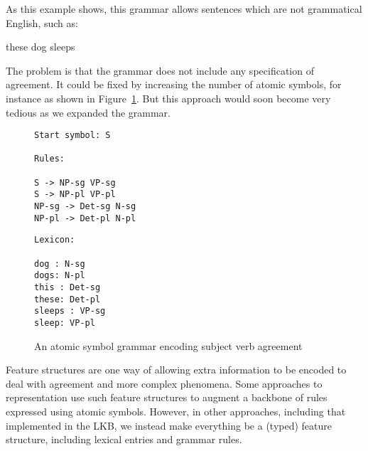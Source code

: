 \documentclass[12pt]{report}
\begin{document}
As this example shows, this grammar allows
sentences which are not grammatical English, such as:
\begin{ex}
these dog sleeps
\end{ex}
The problem is that the grammar does not include any specification of
agreement.  It could be fixed by increasing the number of atomic symbols,
for instance as shown in Figure~\ref{agratomic}.
But this approach
would soon become very tedious as we expanded the grammar.
\begin{figure}[!ht]
{\small
\begin{minipage}[t]{3in}
\begin{verbatim}
Start symbol: S

Rules:

S -> NP-sg VP-sg
S -> NP-pl VP-pl
NP-sg -> Det-sg N-sg
NP-pl -> Det-pl N-pl

\end{verbatim}
\end{minipage}
\begin{minipage}[t]{3in}
\begin{verbatim}
Lexicon:

dog : N-sg
dogs: N-pl
this : Det-sg
these: Det-pl
sleeps : VP-sg
sleep: VP-pl
\end{verbatim}
\end{minipage}}
\caption{An atomic symbol grammar encoding subject verb agreement}
\label{agratomic}
\end{figure}

Feature structures are one way of allowing extra information
to be encoded to
deal with agreement and more complex phenomena.  
Some approaches to representation use such feature structures
to augment a backbone of rules expressed using atomic symbols.
However, in other approaches, including that implemented in the
LKB, we instead make everything be a 
(typed) feature structure, including lexical entries
and grammar rules.  
\end{document}
